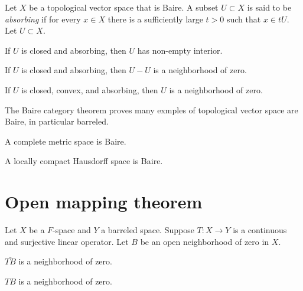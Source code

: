 \documentclass{../../large}
\begin{document}
\begin{prb}
Let $X$ be a topological vector space that is Baire.
A subset $U\subset X$ is said to be \emph{absorbing} if for every $x\in X$ there is a sufficiently large $t>0$ such that $x\in tU$.
Let $U\subset X$.
\begin{parts}
\item If $U$ is closed and absorbing, then $U$ has non-empty interior.
\item If $U$ is closed and absorbing, then $U-U$ is a neighborhood of zero.
\item If $U$ is closed, convex, and absorbing, then $U$ is a neighborhood of zero.
\end{parts}
\end{prb}


\begin{prb}
The Baire category theorem proves many exmples of topological vector space are Baire, in particular barreled.
\begin{parts}
\item A complete metric space is Baire.
\item A locally compact Hausdorff space is Baire.
\end{parts}
\end{prb}




\section{Open mapping theorem}

\begin{prb}
Let $X$ be a $F$-space and $Y$ a barreled space.
Suppose $T:X\to Y$ is a continuous and surjective linear operator.
Let $B$ be an open neighborhood of zero in $X$.
\begin{parts}
\item $\bar{TB}$ is a neighborhood of zero.
\item $TB$ is a neighborhood of zero.
\end{parts}
\end{prb}
\end{document}
